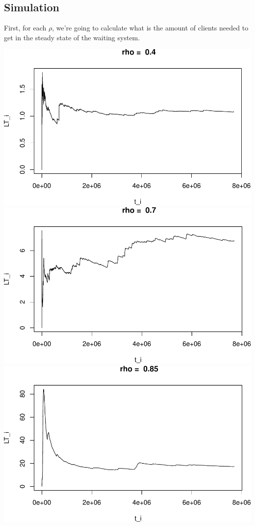 \documentclass[]{article}
\begin{document}
\subsection{Simulation}\label{simulation}

First, for each \(\rho\), we're going to calculate what is the amount of
clients needed to get in the steady state of the waiting system.

\includegraphics{003_files/figure-latex/unnamed-chunk-10-1.pdf}
\includegraphics{003_files/figure-latex/unnamed-chunk-10-2.pdf}
\includegraphics{003_files/figure-latex/unnamed-chunk-10-3.pdf}
\end{document}
